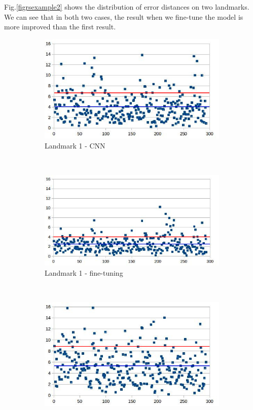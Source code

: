 \documentclass[10pt]{article}
\begin{document}
Fig.\ref{figrsexample2} shows the distribution of error distances on two landmarks. We can see that in both two cases, the result when we fine-tune the model is more improved than the first result.
\begin{figure}[htbp]
   
    \begin{subfigure}[t]{0.25\textwidth}
        \centering
        \includegraphics[scale=.35]{images/lm1_cnn_2}
        \caption{\small{Landmark 1 - CNN}}
        \label{figsub11}
    \end{subfigure}%
    ~ 
    \begin{subfigure}[t]{0.25\textwidth}
        \centering
        \includegraphics[scale=.34]{images/lm1_finetuning_2}
        \caption{\small{Landmark 1 - fine-tuning}}
        \label{figsub22}
    \end{subfigure}~\\
    \begin{subfigure}[t]{0.25\textwidth}
        \centering
        \includegraphics[scale=.33]{images/lm6_cnn_2}

\end{subfigure}
\end{figure}
\end{document}
